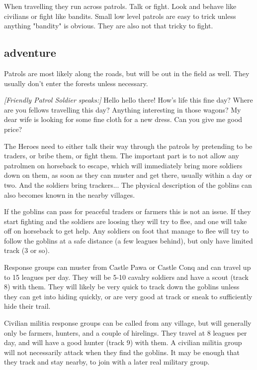 When travelling they run across patrols. Talk or fight. Look and behave like civilians or fight like bandits. Small low level patrols are easy to trick unless anything "bandity" is obvious. They are also not that tricky to fight.


\subsection*{adventure}

Patrols are most likely along the roads, but will be out in the field as well. They usually don't enter the forests unless necessary.

\begin{readoutloud}
\emph{[Friendly Patrol Soldier speaks:]}
Hello hello there! How's life this fine day? Where are you fellows travelling this day? Anything interesting in those wagons? My dear wife is looking for some fine cloth for a new dress. Can you give me good price?
\end{readoutloud}

\noindent The Heroes need to either talk their way through the patrols by pretending to be traders, or bribe them, or fight them. The important part is to not allow any patrolmen on horseback to escape, which will immediately bring more soldiers down on them, as soon as they can muster and get there, usually within a day or two. And the soldiers bring trackers... The physical description of the goblins can also becomes known in the nearby villages.

If the goblins can pass for peaceful traders or farmers this is not an issue. If they start fighting and the soldiers are loosing they will try to flee, and one will take off on horseback to get help. Any soldiers on foot that manage to flee will try to follow the goblins at a safe distance (a few leagues behind), but only have limited track (3 or so).

Response groups can muster from Castle Pawa or Castle Conq and can travel up to 15 leagues per day. They will be 5-10 cavalry soldiers and have a scout (track 8) with them. They will likely be very quick to track down the goblins unless they can get into hiding quickly, or are very good at track or sneak to sufficiently hide their trail.

Civilian militia response groups can be called from any village, but will generally only be farmers, hunters, and a couple of hirelings. They travel at 8 leagues per day, and will have a good hunter (track 9) with them. A civilian militia group will not necessarily attack when they find the goblins. It may be enough that they track and stay nearby, to join with a later real military group.

